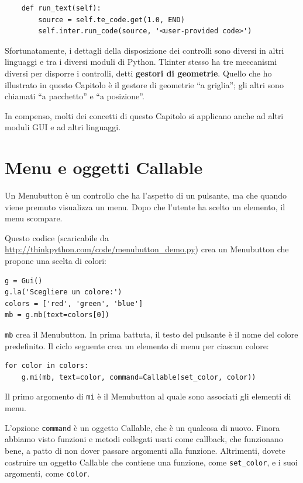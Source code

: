 \documentclass[10pt]{book}
\begin{document}
\begin{verbatim}
    def run_text(self):
        source = self.te_code.get(1.0, END)
        self.inter.run_code(source, '<user-provided code>')
\end{verbatim}
%
Sfortunatamente, i dettagli della disposizione dei controlli sono diversi in altri linguaggi e tra i diversi moduli di Python. Tkinter stesso ha tre meccanismi diversi per disporre i controlli, detti {\bf gestori di geometrie}.
Quello che ho illustrato in questo Capitolo è il gestore di geometrie ``a griglia''; gli altri sono chiamati ``a pacchetto'' e ``a posizione''.

In compenso, molti dei concetti di questo Capitolo si applicano anche ad altri moduli GUI e ad altri linguaggi.


\section{Menu e oggetti Callable}

Un Menubutton è un controllo che ha l'aspetto di un pulsante, ma che quando viene premuto visualizza un menu. Dopo che l'utente ha scelto un elemento, il menu scompare.

Questo codice (scaricabile da \url{http://thinkpython.com/code/menubutton_demo.py}) crea un Menubutton che propone una scelta di colori:

\begin{verbatim}
g = Gui()
g.la('Scegliere un colore:')
colors = ['red', 'green', 'blue']
mb = g.mb(text=colors[0])
\end{verbatim}
%
{\tt mb} crea il Menubutton. In prima battuta, il testo del pulsante è il nome del colore predefinito. Il ciclo seguente crea un elemento di menu per ciascun colore:

\begin{verbatim}
for color in colors:
    g.mi(mb, text=color, command=Callable(set_color, color))
\end{verbatim}
%
Il primo argomento di {\tt mi} è il Menubutton al quale sono associati gli elementi di menu.

L'opzione {\tt command} è un oggetto Callable, che è un qualcosa di nuovo.
Finora abbiamo visto funzioni e metodi collegati usati come callback, che funzionano bene, a patto di non dover passare argomenti alla funzione. Altrimenti, dovete costruire un oggetto Callable che contiene una funzione, come \verb"set_color", e i suoi argomenti, come {\tt color}.
\end{document}
